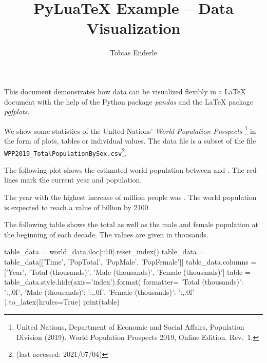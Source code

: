 \documentclass{article}
\title{PyLuaTeX Example -- Data Visualization}
\author{Tobias Enderle}
\begin{document}
\maketitle

This document demonstrates how data can be visualized flexibly in a \LaTeX{}
document with the help of the Python package \emph{pandas} and the \LaTeX{}
package \emph{pgfplots}.

We show some statistics of the United Nations' \emph{World Population Prospects}%
\footnote{United Nations, Department of Economic and Social Affairs, Population
Division (2019). World Population Prospects 2019, Online Edition. Rev.\ 1.} in the
form of plots, tables or individual values.
The data file \texttt{} is a subset of the file
\texttt{WPP2019\_TotalPopulationBySex.csv}\footnote{\dataurl{} (last accessed:
2021/07/04)}.

The following plot shows the estimated world population between 
and . The red lines mark the current year and population.

\begin{center}
\end{center}

The year with the highest increase of  million people
was . The world population is expected to reach a value
of  billion by 2100.

The following table shows the total as well as the male and female population at
the beginning of each decade. The values are given in thousands.
\begin{center}
\begin{python}
table_data = world_data.iloc[::10].reset_index()
table_data = table_data[['Time', 'PopTotal', 'PopMale', 'PopFemale']]
table_data.columns = ['Year', 'Total (thousands)', 'Male (thousands)', 'Female (thousands)']
table = table_data.style.hide(axis='index').format(
    formatter={
        'Total (thousands)': '{:,.0f}',
        'Male (thousands)': '{:,.0f}',
        'Female (thousands)': '{:,.0f}'
    }
).to_latex(hrules=True)
print(table)
\end{python}
\end{center}
\end{document}
